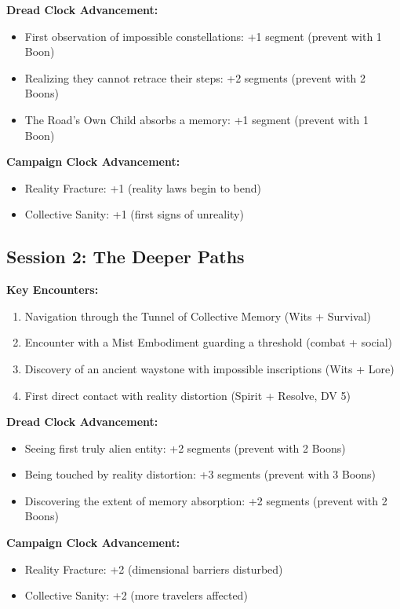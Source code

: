 \documentclass[11pt]{article}
\begin{document}
\textbf{Dread Clock Advancement:}
\begin{itemize}
\item First observation of impossible constellations: +1 segment (prevent with 1 Boon)
\item Realizing they cannot retrace their steps: +2 segments (prevent with 2 Boons)
\item The Road's Own Child absorbs a memory: +1 segment (prevent with 1 Boon)
\end{itemize}

\textbf{Campaign Clock Advancement:}
\begin{itemize}
\item Reality Fracture: +1 (reality laws begin to bend)
\item Collective Sanity: +1 (first signs of unreality)
\end{itemize}

\subsection{Session 2: The Deeper Paths}

\textbf{Key Encounters:}
\begin{enumerate}
\item Navigation through the Tunnel of Collective Memory (Wits + Survival)
\item Encounter with a Mist Embodiment guarding a threshold (combat + social)
\item Discovery of an ancient waystone with impossible inscriptions (Wits + Lore)
\item First direct contact with reality distortion (Spirit + Resolve, DV 5)
\end{enumerate}

\textbf{Dread Clock Advancement:}
\begin{itemize}
\item Seeing first truly alien entity: +2 segments (prevent with 2 Boons)
\item Being touched by reality distortion: +3 segments (prevent with 3 Boons)
\item Discovering the extent of memory absorption: +2 segments (prevent with 2 Boons)
\end{itemize}

\textbf{Campaign Clock Advancement:}
\begin{itemize}
\item Reality Fracture: +2 (dimensional barriers disturbed)
\item Collective Sanity: +2 (more travelers affected)
\end{itemize}
\end{document}
